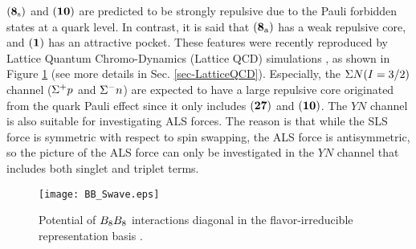 ${\bf (8_{\rm{s}})}$ and ${\bf (10)}$ are predicted to be strongly repulsive due to the Pauli forbidden states at a quark level. In contrast, it is said that ${\bf (8_{\rm{a}})}$ has a weak repulsive core, and ${\bf (1)}$ has an attractive pocket. These features were recently reproduced by Lattice Quantum Chromo-Dynamics (Lattice QCD) simulations \cite{QCD-2019}, as shown in Figure \ref{fig-BB_Swave} (see more details in Sec. \ref{sec-LatticeQCD}). Especially, the $\Sigma N(I=3/2)$ channel ($\Sigma^{+}p$ and $\Sigma^{-}n$) are expected to have a large repulsive core originated from the quark Pauli effect since it only includes ${\bf (27)}$ and ${\bf (10)}$. The $YN$ channel is also suitable for investigating ALS forces. The reason is that while the SLS force is symmetric with respect to spin swapping, the ALS force is antisymmetric, so the picture of the ALS force can only be investigated in the $YN$ channel that includes both singlet and triplet terms. 

\begin{figure}[h]
 \begin{center}
   \texttt{[image: BB\_Swave.eps]}
   \caption{Potential of $B_{8}B_{8}$ interactions diagonal in the flavor-irreducible representation basis \cite{QCD-2019}.}
   \label{fig-BB_Swave}
 \end{center}
\end{figure}

